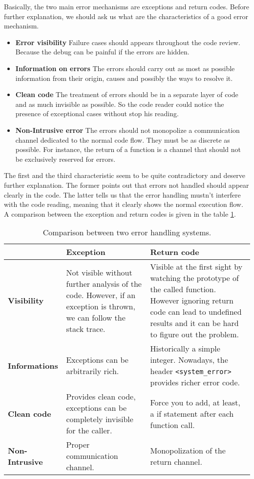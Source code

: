 \documentclass[a4paper,10pt]{article}
\newcommand{\cpp}[1]{\lstinline{#1}}
\begin{document}
Basically, the two main error mechanisms are exceptions and return codes. Before further explanation, we should ask us what are the characteristics of a good error mechanism.

\begin{itemize}
 \item \textbf{Error visibility} Failure cases should appears throughout the code review. Because the debug can be painful if the errors are hidden.
 \item \textbf{Information on errors} The errors should carry out as most as possible information from their origin, causes and possibly the ways to resolve it.
 \item \textbf{Clean code} The treatment of errors should be in a separate layer of code and as much invisible as possible. So the code reader could notice the presence of exceptional cases without stop his reading.
 \item \textbf{Non-Intrusive error} The errors should not monopolize a communication channel dedicated to the normal code flow. They must be as discrete as possible. For instance, the return of a function is a channel that should not be exclusively reserved for errors.
\end{itemize}

The first and the third characteristic seem to be quite contradictory and deserve further explanation. The former points out that errors not handled should appear clearly in the code. The latter tells us that the error handling mustn't interfere with the code reading, meaning that it clearly shows the normal execution flow. A comparison between the exception and return codes is given in the table \ref{comp-handling-error}.


\begin{table}
\bgroup
\def\arraystretch{1.5}
\begin{tabular}{|l|>{\raggedright\arraybackslash}p{5cm}|>{\raggedright\arraybackslash}p{5cm}|}
\hline
                    & \textbf{Exception} & \textbf{Return code} \\
\hline
\textbf{Visibility} & Not visible without further analysis of the code. However, if an exception is thrown, we can follow the stack trace. & Visible at the first sight by watching the prototype of the called function. However ignoring return code can lead to undefined results and it can be hard to figure out the problem. \\
\hline
\textbf{Informations} & Exceptions can be arbitrarily rich. & Historically a simple integer. Nowadays, the header \cpp{<system_error>} provides richer error code. \\
\hline
\textbf{Clean code} & Provides clean code, exceptions can be completely invisible for the caller. & Force you to add, at least, a if statement after each function call. \\
\hline
\textbf{Non-Intrusive} & Proper communication channel. & Monopolization of the return channel. \\
\hline
\end{tabular}
\egroup
\caption{Comparison between two error handling systems.}
\label{comp-handling-error}
\end{table}
\end{document}
